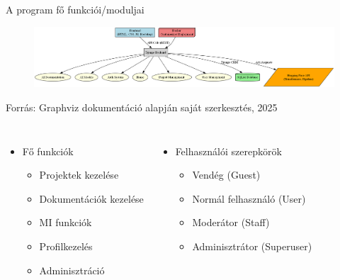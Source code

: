 \documentclass[11pt]{beamer}
\begin{document}
\begin{frame}{A program fő funkciói/moduljai}
    \vspace{-2em}
    \begin{figure}[ht!]
        \centering
        \includegraphics[width=\textwidth]{system_architecture.png}
           \label{fig-system-architecture}
    \end{figure}
    \vspace{-2em}
    \begin{center}
        \scriptsize
        Forrás: Graphviz dokumentáció alapján saját szerkesztés, 2025
    \end{center}
    \vspace{-1.5em}
    \begin{columns}[t]
        \begin{itemize}
            \item Fő funkciók
            \begin{itemize}
                \vspace{0.5em}
                \item Projektek kezelése
                \vspace{0.5em}
                \item Dokumentációk kezelése
                \vspace{0.5em}
                \item MI funkciók
                \vspace{0.5em}
                \item Profilkezelés
                \vspace{0.5em}
                \item Adminisztráció
            \end{itemize}
        \end{itemize}
        
        \begin{itemize}
            \item Felhasználói szerepkörök
            \begin{itemize}
                \vspace{0.5em}
                \item Vendég (Guest)
                \vspace{0.5em}
                \item Normál felhasználó (User)
                \vspace{0.5em}
                \item Moderátor (Staff)
                \vspace{0.5em}
                \item Adminisztrátor (Superuser)
            \end{itemize}
        \end{itemize}
    \end{columns}
    

\end{frame}
\end{document}

